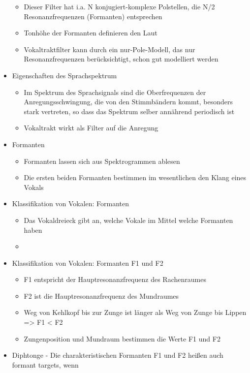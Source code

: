 \documentclass[a4paper,10pt,oneside]{article}
\begin{document}
\begin{itemize}
\begin{itemize}
				\item Dieser Filter hat i.a. N konjugiert-komplexe Polstellen, die N/2 Resonanzfrequenzen (Formanten) entsprechen
				\item Tonhöhe der Formanten definieren den Laut
				\item Vokaltraktfilter kann durch ein nur-Pole-Modell, das nur Resonanzfrequenzen berücksichtigt, schon gut modelliert werden
			\end{itemize}
		\item Eigenschaften des Sprachspektrum
			\begin{itemize}
				\item Im Spektrum des Sprachsignals sind die Oberfrequenzen der Anregungsschwingung, die von den Stimmbändern kommt, besonders stark vertreten, so dass das Spektrum selber annährend periodisch ist
				\item Vokaltrakt wirkt als Filter auf die Anregung
			\end{itemize}
		\item Formanten
			\begin{itemize}
				\item Formanten lassen sich aus Spektrogrammen ablesen
				\item Die ersten beiden Formanten bestimmen im wesentlichen den Klang eines Vokals
			\end{itemize}
		\item Klassifikation von Vokalen: Formanten
			\begin{itemize}
				\item Das Vokaldreieck gibt an, welche Vokale im Mittel welche Formanten haben
				\item[] %
			\end{itemize}
		\item Klassifikation von Vokalen: Formanten F1 und F2
			\begin{itemize}
				\item F1 entspricht der Hauptresonanzfrequenz des Rachenraumes
				\item F2 ist die Hauptresonanzfrequenz des Mundraumes
				\item Weg von Kehlkopf bis zur Zunge ist länger als Weg von Zunge bis Lippen => F1 < F2
				\item Zungenposition und Mundraum bestimmen die Werte F1 und F2
			\end{itemize}
		\item Diphtonge - Die charakteristischen Formanten F1 und F2 heißen auch formant targets, wenn
			\begin{itemize}

\end{itemize}
\end{itemize}
\end{document}
